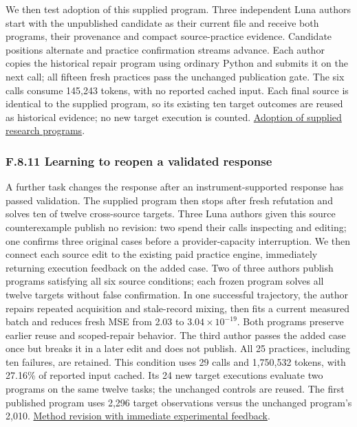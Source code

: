 \documentclass[11pt,a4paper]{article}
\begin{document}
We then test adoption of this supplied program. Three independent Luna authors
start with the unpublished candidate as their current file and receive both
programs, their provenance and compact source-practice evidence. Candidate
positions alternate and practice confirmation streams advance. Each author
copies the historical repair program using ordinary Python and submits it on
the next call; all fifteen fresh practices pass the unchanged publication gate.
The six calls consume 145,243 tokens, with no reported cached input. Each final
source is identical to the supplied program, so its existing ten target outcomes
are reused as historical evidence; no new target execution is counted.
\hyperlink{artifact-92}{Adoption of supplied research programs}.


\subsubsection*{F.8.11 Learning to reopen a validated response}

A further task changes the response after an instrument-supported response has
passed validation. The supplied program then stops after fresh refutation and
solves ten of twelve cross-source targets. Three Luna authors given this source
counterexample publish no revision: two spend their calls inspecting and editing;
one confirms three original cases before a provider-capacity interruption. We
then connect each source edit to the existing paid practice engine, immediately
returning execution feedback on the added case. Two of three authors publish
programs satisfying all six source conditions; each frozen program solves all
twelve targets without false confirmation. In one successful trajectory, the
author repairs repeated acquisition and stale-record mixing, then fits a current
measured batch and reduces fresh MSE from 2.03 to \(3.04\times10^{-19}\). Both
programs preserve earlier reuse and scoped-repair behavior. The third author
passes the added case once but breaks it in a later edit and does not publish.
All 25 practices, including ten failures, are retained. This condition uses
29 calls and 1,750,532 tokens, with 27.16\% of reported input cached. Its 24 new
target executions evaluate two programs on the same twelve tasks; the unchanged
controls are reused. The first published program uses 2,296 target observations
versus the unchanged program's 2,010.
\hyperlink{artifact-93}{Method revision with immediate experimental feedback}.
\end{document}
